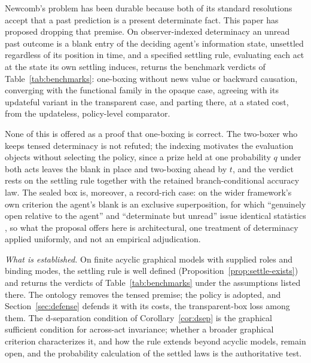 \noindent Newcomb's problem has been durable because both of its standard resolutions accept that a past prediction is a present determinate fact. This paper has proposed dropping that premise. On observer-indexed determinacy an unread past outcome is a blank entry of the deciding agent's information state, unsettled regardless of its position in time, and a specified settling rule, evaluating each act at the state its own settling induces, returns the benchmark verdicts of Table~\ref{tab:benchmarks}: one-boxing without news value or backward causation, converging with the functional family in the opaque case, agreeing with its updateful variant in the transparent case, and parting there, at a stated cost, from the updateless, policy-level comparator.

None of this is offered as a proof that one-boxing is correct. The two-boxer who keeps tensed determinacy is not refuted; the indexing motivates the evaluation objects without selecting the policy, since a prize held at one probability $q$ under both acts leaves the blank in place and two-boxing ahead by $t$, and the verdict rests on the settling rule together with the retained branch-conditional accuracy law. The sealed box is, moreover, a record-rich case: on the wider framework's own criterion the agent's blank is an exclusive superposition, for which ``genuinely open relative to the agent'' and ``determinate but unread'' issue identical statistics \cite{AethusBrief}, so what the proposal offers here is architectural, one treatment of determinacy applied uniformly, and not an empirical adjudication.

\noindent\textit{What is established.} On finite acyclic graphical models with supplied roles and binding modes, the settling rule is well defined (Proposition~\ref{prop:settle-exists}) and returns the verdicts of Table~\ref{tab:benchmarks} under the assumptions listed there. The ontology removes the tensed premise; the policy is adopted, and Section~\ref{sec:defense} defends it with its costs, the transparent-box loss among them. The d-separation condition of Corollary~\ref{cor:dsep} is the graphical sufficient condition for across-act invariance; whether a broader graphical criterion characterizes it, and how the rule extends beyond acyclic models, remain open, and the probability calculation of the settled laws is the authoritative test.

